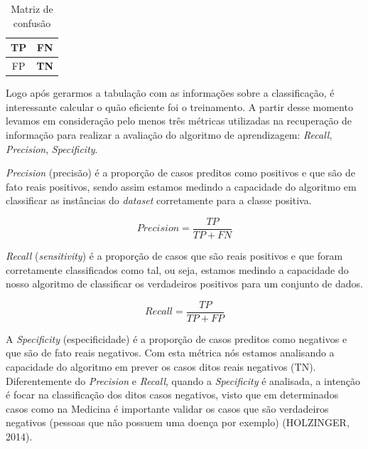 \begin{table}[h]
	\caption{\label{tab:confusion}Matriz de confusão}
	\begin{center}
	\begin{tabular}{c|c}
		\hline 
		\textbf{TP} & FN \\ 
		\hline
		FP & \textbf{TN} \\ 
		\hline 
	\end{tabular} 
	\end{center}
\end{table}

Logo após gerarmos a tabulação com as informações sobre a classificação, é  interessante calcular o quão eficiente foi o treinamento. A partir desse momento levamos em consideração pelo menos três métricas utilizadas na recuperação de informação \cite{Buttcher2016} para realizar a avaliação do algoritmo de aprendizagem: \textit{Recall}, \textit{Precision}, \textit{Specificity}.

\textit{Precision} (precisão) é a proporção de casos preditos como positivos e que são de fato reais positivos, sendo assim estamos medindo a capacidade do algoritmo em classificar as instâncias do \textit{dataset} corretamente para a classe positiva.

\begin{equation}
Precision  = \frac{TP}{TP + FN}
\end{equation}

\textit{Recall} (\textit{sensitivity}) é a proporção de casos que são reais positivos e que foram corretamente classificados como tal, ou seja, estamos medindo a capacidade do nosso algoritmo de classificar os verdadeiros positivos para um conjunto de dados.

\begin{equation}
Recall  = \frac{TP}{TP + FP}
\end{equation}


A \textit{Specificity} (especificidade) é a proporção de casos preditos como negativos e que são de fato reais negativos. Com esta métrica nós estamos analisando a capacidade do algoritmo em prever os casos ditos reais negativos (TN). Diferentemente do \textit{Precision} e \textit{Recall}, quando a \textit{Specificity} é analisada, a intenção é focar na classificação dos ditos casos negativos, visto que em determinados casos como na Medicina é importante validar os casos que são verdadeiros negativos (pessoas que não possuem uma doença por exemplo) (HOLZINGER, 2014).

